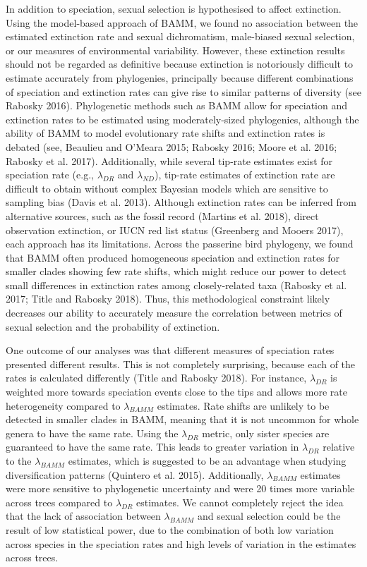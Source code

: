 \documentclass[]{article}
\begin{document}
In addition to speciation, sexual selection is hypothesised to affect
extinction. Using the model-based approach of BAMM, we found no
association between the estimated extinction rate and sexual
dichromatism, male-biased sexual selection, or our measures of
environmental variability. However, these extinction results should not
be regarded as definitive because extinction is notoriously difficult to
estimate accurately from phylogenies, principally because different
combinations of speciation and extinction rates can give rise to similar
patterns of diversity (see Rabosky 2016). Phylogenetic methods such as
BAMM allow for speciation and extinction rates to be estimated using
moderately-sized phylogenies, although the ability of BAMM to model
evolutionary rate shifts and extinction rates is debated (see, Beaulieu
and O'Meara 2015; Rabosky 2016; Moore et al. 2016; Rabosky et al. 2017).
Additionally, while several tip-rate estimates exist for speciation rate
(e.g., \(\lambda_{DR}\) and \(\lambda_{ND}\)), tip-rate estimates of
extinction rate are difficult to obtain without complex Bayesian models
which are sensitive to sampling bias (Davis et al. 2013). Although
extinction rates can be inferred from alternative sources, such as the
fossil record (Martins et al. 2018), direct observation extinction, or
IUCN red list status (Greenberg and Mooers 2017), each approach has its
limitations. Across the passerine bird phylogeny, we found that BAMM
often produced homogeneous speciation and extinction rates for smaller
clades showing few rate shifts, which might reduce our power to detect
small differences in extinction rates among closely-related taxa
(Rabosky et al. 2017; Title and Rabosky 2018). Thus, this methodological
constraint likely decreases our ability to accurately measure the
correlation between metrics of sexual selection and the probability of
extinction.

One outcome of our analyses was that different measures of speciation
rates presented different results. This is not completely surprising,
because each of the rates is calculated differently (Title and Rabosky
2018). For instance, \(\lambda_{DR}\) is weighted more towards
speciation events close to the tips and allows more rate heterogeneity
compared to \(\lambda_{BAMM}\) estimates. Rate shifts are unlikely to be
detected in smaller clades in BAMM, meaning that it is not uncommon for
whole genera to have the same rate. Using the \(\lambda_{DR}\) metric,
only sister species are guaranteed to have the same rate. This leads to
greater variation in \(\lambda_{DR}\) relative to the \(\lambda_{BAMM}\)
estimates, which is suggested to be an advantage when studying
diversification patterns (Quintero et al. 2015). Additionally,
\(\lambda_{BAMM}\) estimates were more sensitive to phylogenetic
uncertainty and were 20 times more variable across trees compared to
\(\lambda_{DR}\) estimates. We cannot completely reject the idea that
the lack of association between \(\lambda_{BAMM}\) and sexual selection
could be the result of low statistical power, due to the combination of
both low variation across species in the speciation rates and high
levels of variation in the estimates across trees.
\end{document}
